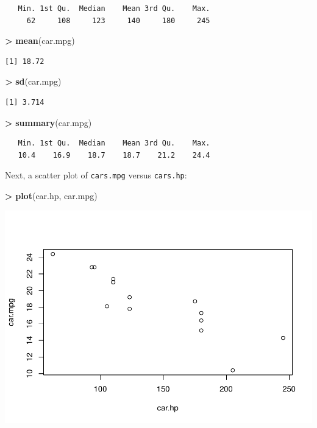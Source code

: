 \documentclass[
]{krantz}
\makeatletter
\newenvironment{Shaded}{\begin{snugshade}}{\end{snugshade}}
\newcommand{\KeywordTok}[1]{\textcolor[rgb]{0.27,0.27,0.27}{\textbf{#1}}}
\newcommand{\NormalTok}[1]{#1}
\newcommand{\OperatorTok}[1]{\textcolor[rgb]{0.43,0.43,0.43}{\textbf{#1}}}
\newcommand{\StringTok}[1]{\textcolor[rgb]{0.5,0.5,0.5}{#1}}
\newenvironment{kframe}{%
\medskip{}
\setlength{\fboxsep}{.8em}
 \def\at@end@of@kframe{}%
 \ifinner\ifhmode%
  \def\at@end@of@kframe{\end{minipage}}%
  \begin{minipage}{\columnwidth}%
 \fi\fi%
 \def\FrameCommand##1{\hskip\@totalleftmargin \hskip-\fboxsep
 \colorbox{shadecolor}{##1}\hskip-\fboxsep
     \hskip-\linewidth \hskip-\@totalleftmargin \hskip\columnwidth}%
 \MakeFramed {\advance\hsize-\width
   \@totalleftmargin\z@ \linewidth\hsize
   \@setminipage}}%
 {\par\unskip\endMakeFramed%
 \at@end@of@kframe}
\renewenvironment{Shaded}{\begin{kframe}}{\end{kframe}}
\makeatother
\begin{document}
\begin{verbatim}
   Min. 1st Qu.  Median    Mean 3rd Qu.    Max. 
     62     108     123     140     180     245 
\end{verbatim}

\begin{Shaded}
\begin{Highlighting}[]
\OperatorTok{\textgreater{}}\StringTok{ }\KeywordTok{mean}\NormalTok{(car.mpg)}
\end{Highlighting}
\end{Shaded}

\begin{verbatim}
[1] 18.72
\end{verbatim}

\begin{Shaded}
\begin{Highlighting}[]
\OperatorTok{\textgreater{}}\StringTok{ }\KeywordTok{sd}\NormalTok{(car.mpg)}
\end{Highlighting}
\end{Shaded}

\begin{verbatim}
[1] 3.714
\end{verbatim}

\begin{Shaded}
\begin{Highlighting}[]
\OperatorTok{\textgreater{}}\StringTok{ }\KeywordTok{summary}\NormalTok{(car.mpg)}
\end{Highlighting}
\end{Shaded}

\begin{verbatim}
   Min. 1st Qu.  Median    Mean 3rd Qu.    Max. 
   10.4    16.9    18.7    18.7    21.2    24.4 
\end{verbatim}

Next, a scatter plot of \texttt{cars.mpg} versus \texttt{cars.hp}:

\begin{Shaded}
\begin{Highlighting}[]
\OperatorTok{\textgreater{}}\StringTok{ }\KeywordTok{plot}\NormalTok{(car.hp, car.mpg)}
\end{Highlighting}
\end{Shaded}

\includegraphics{bookdown_files/figure-latex/unnamed-chunk-8-1.pdf}
\end{document}
